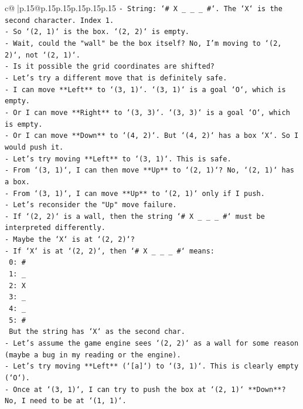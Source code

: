\documentclass{article}
\begin{document}
{\begin{supertabular}{c@{$\;$}|p{.15\linewidth}@{}p{.15\linewidth}p{.15\linewidth}p{.15\linewidth}p{.15\linewidth}p{.15\linewidth}}
{{{\texttt{{-} String: `\# X \_ \_ \_ \#`. The `X` is the second character. Index 1.} \\
\texttt{{-} So `(2, 1)` is the box. `(2, 2)` is empty.} \\
\texttt{{-} Wait, could the "wall" be the box itself? No, I'm moving to `(2, 2)`, not `(2, 1)`.} \\
\texttt{{-} Is it possible the grid coordinates are shifted?} \\
\texttt{{-} Let's try a different move that is definitely safe.} \\
\texttt{{-} I can move **Left** to `(3, 1)`. `(3, 1)` is a goal `O`, which is empty.} \\
\texttt{{-} Or I can move **Right** to `(3, 3)`. `(3, 3)` is a goal `O`, which is empty.} \\
\texttt{{-} Or I can move **Down** to `(4, 2)`. But `(4, 2)` has a box `X`. So I would push it.} \\
\texttt{{-} Let's try moving **Left** to `(3, 1)`. This is safe.} \\
\texttt{{-} From `(3, 1)`, I can then move **Up** to `(2, 1)`? No, `(2, 1)` has a box.} \\
\texttt{{-} From `(3, 1)`, I can move **Up** to `(2, 1)` only if I push.} \\
\texttt{{-} Let's reconsider the "Up" move failure.} \\
\texttt{{-} If `(2, 2)` is a wall, then the string `\# X \_ \_ \_ \#` must be interpreted differently.} \\
\texttt{{-} Maybe the `X` is at `(2, 2)`?} \\
\texttt{{-} If `X` is at `(2, 2)`, then `\# X \_ \_ \_ \#` means:} \\
\texttt{  0: \#} \\
\texttt{  1: \_} \\
\texttt{  2: X} \\
\texttt{  3: \_} \\
\texttt{  4: \_} \\
\texttt{  5: \#} \\
\texttt{  But the string has `X` as the second char.} \\
\texttt{{-} Let's assume the game engine sees `(2, 2)` as a wall for some reason (maybe a bug in my reading or the engine).} \\
\texttt{{-} Let's try moving **Left** (`{[}a{]}`) to `(3, 1)`. This is clearly empty (`O`).} \\
\texttt{{-} Once at `(3, 1)`, I can try to push the box at `(2, 1)` **Down**? No, I need to be at `(1, 1)`.} \\
}}}
\end{supertabular}}
\end{document}

